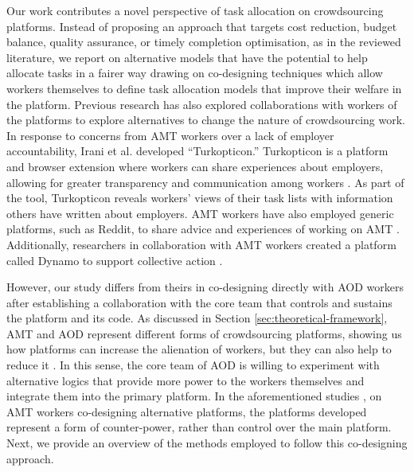 Our work contributes a novel perspective of task allocation on crowdsourcing platforms. Instead of proposing an approach that targets cost reduction, budget balance, quality assurance, or timely completion optimisation, as in the reviewed literature, we report on alternative models that have the potential to help allocate tasks in a fairer way drawing on co-designing techniques which allow workers themselves to define task allocation models that improve their welfare in the platform. Previous research has also explored collaborations with workers of the platforms to explore alternatives to change the nature of crowdsourcing work. In response to concerns from AMT workers over a lack of employer accountability, Irani et al. \cite{irani2013turkopticon} developed ``Turkopticon.'' Turkopticon is a platform and browser extension where workers can share experiences about employers, allowing for greater transparency and communication among workers \cite{irani2013turkopticon}. As part of the tool, Turkopticon reveals workers’ views of their task lists with information others have written about employers. AMT workers have also employed generic platforms, such as Reddit, to share advice and experiences of working on AMT \cite{martin2014being, zyskowski2018crowded}. Additionally, researchers in collaboration with AMT workers created a platform called Dynamo to support collective action \cite{salehi2015we}.

However, our study differs from theirs in co-designing directly with AOD workers after establishing a collaboration with the core team that controls and sustains the platform and its code. As discussed in Section \ref{sec:theoretical-framework}, AMT and AOD represent different forms of crowdsourcing platforms, showing us how platforms can increase the alienation of workers, but they can also help to reduce it \cite{hansson_capitalizing_2018}. In this sense, the core team of AOD is willing to experiment with alternative logics that provide more power to the workers themselves and integrate them into the primary platform. In the aforementioned studies \cite{irani2013turkopticon, salehi2015we}, on AMT workers co-designing alternative platforms, the platforms developed represent a form of counter-power, rather than control over the main platform. Next, we provide an overview of the methods employed to follow this co-designing approach.
